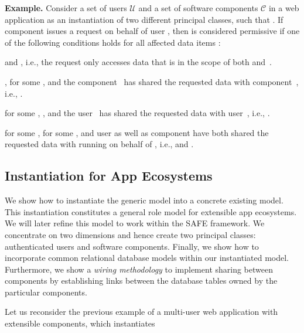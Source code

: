 \documentclass{src/acm_proc_article-sp} \else
\newcommand\myparagraph[1]{\medskip\noindent\textbf{#1.}}
\newcommand\cC{\ensuremath{\mathcal{C}}\xspace}
\newcommand\cU{\ensuremath{\mathcal{U}}\xspace}
\newcommand\SAFE{SAFE\xspace}
\begin{document}
\myparagraph{Example}
Consider a set of users \cU and a set of software components
\cC in a web application as an instantiation of two
different principal classes, such that .
If component  issues a request  on
behalf of user , then  is considered
permissive if one of the following conditions holds for all
affected data items :
\vspace{-\parskip}
\begin{description}
  \setlength\itemsep{-1pt}

  \item[No sharing:] \vspace{-2mm} and
  , i.e., the request only
  accesses data that is in the scope of both  and~.

  \item[Cross-\cC sharing:] ,
   for some , and
  the component~ has shared the requested data with
  component~, i.e., .

  \item[Cross-\cU sharing:]  for some ,
  , and the user~ has shared
  the requested data with user~, i.e., .

  \item[Cross-\cU,\cC sharing:] 
  for some ,  for
  some , and user  as well as component 
  have both shared the requested data with  running on
  behalf of , i.e.,  and
  .

\end{description}



   \subsection{Instantiation for App Ecosystems}
\label{sec:instantiation}

We show how to instantiate the generic model into a
concrete existing model. This instantiation
constitutes a general role model for extensible app
ecosystems. We will later refine this model to work
within the \SAFE framework.
We concentrate on two dimensions and hence create two
principal classes: authenticated users and software
components.
Finally, we show how to incorporate common relational
database models within our instantiated model. Furthermore,
we show a \emph{wiring methodology} to implement sharing
between components by establishing links between the
database tables owned by the particular components.


Let us reconsider the previous example of a multi-user web
application with extensible components, which
instantiates
\end{document}

